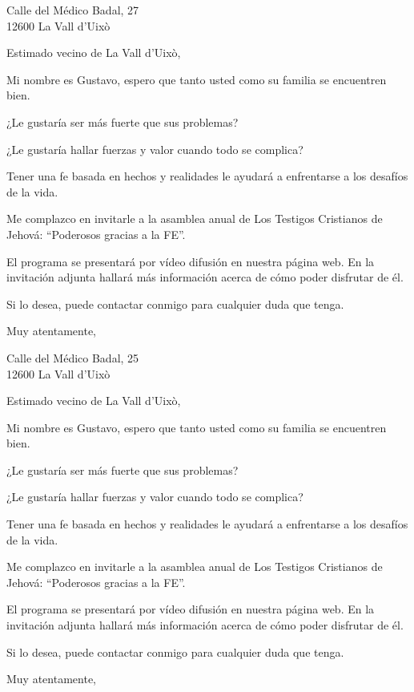 \documentclass{scrlttr2}
\begin{document}
\begin{letter}{%
Calle del Médico Badal, 27\\
12600 La Vall d'Uixò\\
}
\opening{Estimado vecino de La Vall d'Uixò,}

Mi nombre es Gustavo, espero que tanto usted como su familia se encuentren bien.

¿Le gustaría ser más fuerte que sus problemas?

¿Le gustaría hallar fuerzas y valor cuando todo se complica?

Tener una fe basada en hechos y realidades le ayudará a enfrentarse a los desafíos de la vida.

Me complazco en invitarle a la asamblea anual de Los Testigos Cristianos de Jehová: ``Poderosos gracias a la FE''.

El programa se presentará por vídeo difusión en nuestra página web. En la invitación adjunta hallará más información acerca de cómo poder disfrutar de él.

Si lo desea, puede contactar conmigo para cualquier duda que tenga.

\closing{Muy atentamente,}


\end{letter}
\begin{letter}{%
Calle del Médico Badal, 25\\
12600 La Vall d'Uixò\\
}
\opening{Estimado vecino de La Vall d'Uixò,}

Mi nombre es Gustavo, espero que tanto usted como su familia se encuentren bien.

¿Le gustaría ser más fuerte que sus problemas?

¿Le gustaría hallar fuerzas y valor cuando todo se complica?

Tener una fe basada en hechos y realidades le ayudará a enfrentarse a los desafíos de la vida.

Me complazco en invitarle a la asamblea anual de Los Testigos Cristianos de Jehová: ``Poderosos gracias a la FE''.

El programa se presentará por vídeo difusión en nuestra página web. En la invitación adjunta hallará más información acerca de cómo poder disfrutar de él.

Si lo desea, puede contactar conmigo para cualquier duda que tenga.

\closing{Muy atentamente,}


\end{letter}
\end{document}
